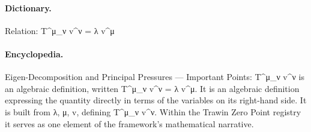 \paragraph{Dictionary.}
Relation: T\textasciicircum{}μ\_ν v\textasciicircum{}ν = λ v\textasciicircum{}μ

\paragraph{Encyclopedia.}
Eigen-Decomposition and Principal Pressures — Important Points: T\textasciicircum{}μ\_ν v\textasciicircum{}ν is an algebraic definition, written T\textasciicircum{}μ\_ν v\textasciicircum{}ν = λ v\textasciicircum{}μ. It is an algebraic definition expressing the quantity directly in terms of the variables on its right-hand side. It is built from λ, μ, v, defining T\textasciicircum{}μ\_ν v\textasciicircum{}ν. Within the Trawin Zero Point registry it serves as one element of the framework's mathematical narrative.
